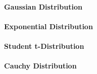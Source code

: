 \paragraph{Gaussian Distribution}











\paragraph{Exponential Distribution}




\paragraph{Student t-Distribution}




\paragraph{Cauchy Distribution}




